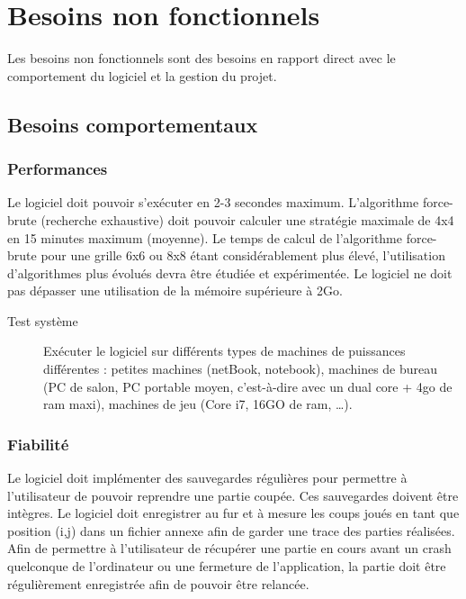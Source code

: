 \section{Besoins non fonctionnels}

Les besoins non fonctionnels sont des besoins en rapport direct avec le comportement du logiciel et la gestion du projet.

\subsection{Besoins comportementaux}

\subsubsection{Performances}

Le logiciel doit pouvoir s'exécuter en 2-3 secondes maximum. L'algorithme force-brute (recherche exhaustive) doit pouvoir calculer une stratégie maximale de 4x4 en 15 minutes maximum (moyenne). Le temps de calcul de l'algorithme force-brute pour une grille 6x6 ou 8x8 étant considérablement plus élevé, l'utilisation d'algorithmes plus évolués devra être étudiée et expérimentée. Le logiciel ne doit pas dépasser une utilisation de la mémoire supérieure à 2Go.

\begin{description}
\item[Test système] Exécuter le logiciel sur différents types de machines de puissances différentes : petites machines (netBook, notebook), machines de bureau (PC de salon, PC portable moyen, c’est-à-dire avec un dual core + 4go de ram maxi), machines de jeu (Core i7, 16GO de ram, …).
\end{description}

\subsubsection{Fiabilité}

Le logiciel doit implémenter des sauvegardes régulières pour permettre à l’utilisateur de pouvoir reprendre une partie coupée. Ces sauvegardes doivent être intègres.
Le logiciel doit enregistrer au fur et à mesure les coups joués en tant que position (i,j) dans un fichier annexe afin de garder une trace des parties réalisées.
Afin de permettre à l’utilisateur de récupérer une partie en cours avant un crash quelconque de l’ordinateur ou une fermeture de l’application, la partie doit être régulièrement enregistrée afin de pouvoir être relancée.

